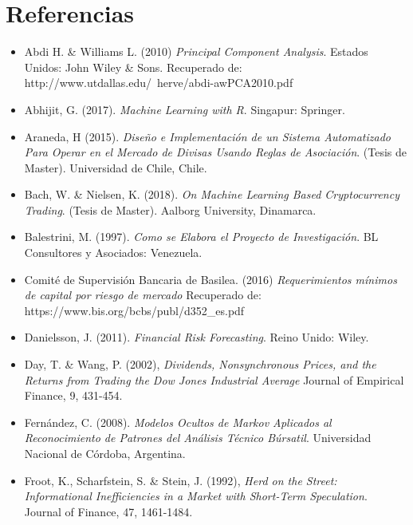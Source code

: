\documentclass[a4paper,12pt]{Latex/Classes/PhDthesisPSnPDF}
\begin{document}

\chapter*{Referencias}

\begin{itemize}

\item Abdi H. \& Williams L. (2010) \textit{Principal Component Analysis}. Estados Unidos: John Wiley \& Sons. Recuperado de: http://www.utdallas.edu/~herve/abdi-awPCA2010.pdf

\item Abhijit, G. (2017). \textit{Machine Learning with R}. Singapur: Springer.

\item Araneda, H (2015). \textit{Diseño e Implementación de un Sistema Automatizado Para Operar en el Mercado de Divisas Usando Reglas de Asociación}. (Tesis de Master). Universidad de Chile, Chile.

\item Bach, W. \& Nielsen, K. (2018). \textit{On Machine Learning Based Cryptocurrency Trading}. (Tesis de Master). Aalborg University, Dinamarca.

\item Balestrini, M. (1997). \textit{Como se Elabora el Proyecto de Investigación}. BL Consultores y Asociados: Venezuela.

\item Comité de Supervisión Bancaria de Basilea. (2016) \textit{Requerimientos mínimos de capital por riesgo de mercado} Recuperado de: https://www.bis.org/bcbs/publ/d352\_es.pdf

\item Danielsson, J. (2011). \textit{Financial Risk Forecasting}. Reino Unido: Wiley.

\item Day, T. \& Wang, P. (2002), \textit{Dividends, Nonsynchronous Prices, and the Returns from Trading the Dow Jones Industrial Average} Journal of Empirical Finance, 9, 431-454.

\item Fernández, C. (2008). \textit{Modelos Ocultos de Markov Aplicados al Reconocimiento de Patrones del Análisis Técnico Búrsatil}. Universidad Nacional de Córdoba, Argentina.

\item Froot, K., Scharfstein, S. \& Stein, J. (1992), \textit{Herd on the Street: Informational Inefficiencies in a Market with Short-Term Speculation}. Journal of Finance, 47, 1461-1484.


\end{itemize}
\end{document}

